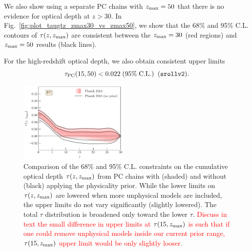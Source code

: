 \documentclass[prd,twocolumn,amsmath,amssymb,floatfix,superscriptaddress,nofootinbib]{revtex4-1}
\newcommand{\zmax}{z_{\rm max}}
\newcommand{\beq}{\begin{equation}}
\newcommand{\eeq}{\end{equation}}
\newcommand{\ch}[1]{\textcolor{red}{#1}}
\begin{document}
{We also show using a separate PC chains with $\zmax = 50$ that there is no evidence for optical depth at $z>30$. 
In Fig.~\ref{fig:plot_taugtz_zmax30_vs_zmax50}, we show that the 68\% and 95\% C.L. contours of $\tau(z, \zmax)$ are consistent between the $\zmax = 30$ (red regions) and $\zmax = 50$ results (black lines).

%
%

For the high-redshift optical depth, we also obtain consistent upper limits
\beq
\tau_{\rm PC}(15, 50) < 0.022 \; (95\%\; \mathrm{C.L.})\;\;(\texttt{srollv2}).
\eeq

\begin{figure}[ht]
\includegraphics[width=0.48\textwidth]{paper/plots/pl18_taugtz_pc_zmax30_pl18_srollv2_with_and_without_physicality_prior.pdf}
\caption{Comparison of the 68\% and 95\% C.L. constraints on the cumulative optical depth $\tau(z, \zmax)$ from PC chains with (shaded) and without (black) applying the physicality prior. While the lower limits on $\tau(z, \zmax)$ are lowered when more unphysical models are included, the upper limits do not vary significantly (slightly lowered).  The total $\tau$ distribution is broadened only toward the lower $\tau$. \ch{Discuss in text the small difference in upper limits at $\tau(15, \zmax)$ is such that if one could remove unphysical models inside our current prior range, $\tau(15, \zmax)$ upper limit would be only slightly looser.} 
}
%
\label{fig:plot_taugtz_2018_with_vs_without_physicality_prior}
\end{figure}


}
\end{document}
